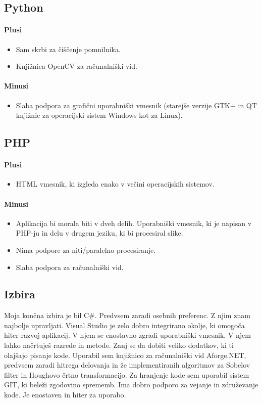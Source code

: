 \documentclass[oneside, a4paper, 12pt]{book}
\begin{document}
\subsection{Python}
\paragraph{Plusi}
\begin{itemize}
\item Sam skrbi za čiščenje pomnilnika.
\item Knjižnica OpenCV za računalniški vid.
\end{itemize}
\paragraph{Minusi}
\begin{itemize}
\item Slaba podpora za grafični uporabniški vmesnik (starejše verzije GTK+ in QT knjižnic za operacijski sistem Windows kot za Linux).
\end{itemize}

\subsection{PHP}
\paragraph{Plusi}
\begin{itemize}
\item HTML vmesnik, ki izgleda enako v večini operacijskih sistemov.
\end{itemize}
\paragraph{Minusi}
\begin{itemize}
\item Aplikacija bi morala biti v dveh delih. Uporabniški vmesnik, ki je napisan v PHP-ju in delu v drugem jeziku, ki bi procesiral slike.
\item Nima podpore za niti/paralelno procesiranje.
\item Slaba podpora za računalniški vid.
\end{itemize}

\subsection{Izbira}
Moja končna izbira je bil C\#. Predvsem zaradi osebnih preferenc. Z njim znam najbolje upravljati. Visual Studio je zelo dobro integrirano okolje, ki omogoča hiter razvoj aplikacij. V njem se enostavno zgradi uporabniški vmesnik. V njem lahko načrtuješ razrede in metode. Zanj se da dobiti veliko dodatkov, ki ti olajšajo pisanje kode. Uporabil sem knjižnico za računalniški vid Aforge.NET, predvsem zaradi hitrega delovanja in že implementiranih algoritmov za Sobelov filter in Houghovo črtno transformacijo. Za hranjenje kode sem uporabil sistem GIT, ki beleži zgodovino sprememb. Ima dobro podporo za vejanje in združevanje kode. Je enostaven in hiter za uporabo.
\end{document}
